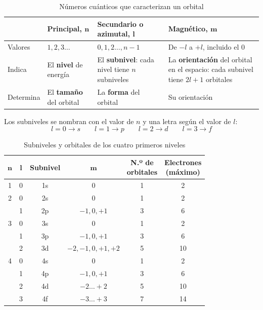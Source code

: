 \begin{table}[H]
    \centering
    \caption{Números cuánticos que caracterizan un orbital}
    \vspace{-5pt}
    \begin{tabular}{@{}lL{3.6cm}L{4.4cm}L{3.8cm}@{}}
        \toprule
        & \textbf{Principal, \(\boldsymbol{n}\)} & \textbf{Secundario o azimutal, \(\boldsymbol{l}\)} & \textbf{Magnético, \(\boldsymbol{m}\)} \\
        \midrule
        Valores & \(1, 2, 3\dots\) & \(0, 1, 2\dots, n-1\) & De \(-l\) a \(+l\), incluido el 0 \\[3pt]
        Indica & El \textbf{nivel} de energía & El \textbf{subnivel}: cada nivel tiene \(n\) subniveles & La \textbf{orientación} del orbital en el espacio: cada subnivel tiene \(2l+1\) orbitales \\[3pt]
        Determina & El \textbf{tamaño} del orbital & La \textbf{forma} del orbital & Su orientación \\
        \bottomrule
    \end{tabular}
    \label{tab:ud3-numeros}
\end{table}

Los subniveles se nombran con el valor de \(n\) y una letra según el valor de \(l\):
\[ l = 0 \rightarrow s \qquad l = 1 \rightarrow p \qquad l = 2 \rightarrow d \qquad l = 3 \rightarrow f \]

\begin{table}[H]
    \centering
    \caption{Subniveles y orbitales de los cuatro primeros niveles}
    \vspace{-5pt}
    \begin{tabular}{@{}cccccc@{}}
        \toprule
        \(\boldsymbol{n}\) & \(\boldsymbol{l}\) & \textbf{Subnivel} & \(\boldsymbol{m}\) & \makecell{\textbf{N.º de} \\ \textbf{orbitales}} & \makecell{\textbf{Electrones} \\ \textbf{(máximo)}} \\
        \midrule
        1 & 0 & 1s & 0 & 1 & 2 \\[3pt]
        \cmidrule(lr){1-6}
        2 & 0 & 2s & 0 & 1 & 2 \\
          & 1 & 2p & \(-1, 0, +1\) & 3 & 6 \\[3pt]
        \cmidrule(lr){1-6}
        3 & 0 & 3s & 0 & 1 & 2 \\
          & 1 & 3p & \(-1, 0, +1\) & 3 & 6 \\
          & 2 & 3d & \(-2, -1, 0, +1, +2\) & 5 & 10 \\[3pt]
        \cmidrule(lr){1-6}
        4 & 0 & 4s & 0 & 1 & 2 \\
          & 1 & 4p & \(-1, 0, +1\) & 3 & 6 \\
          & 2 & 4d & \(-2\dots +2\) & 5 & 10 \\
          & 3 & 4f & \(-3\dots +3\) & 7 & 14 \\
        \bottomrule
    \end{tabular}
    \label{tab:ud3-subniveles}
\end{table}

